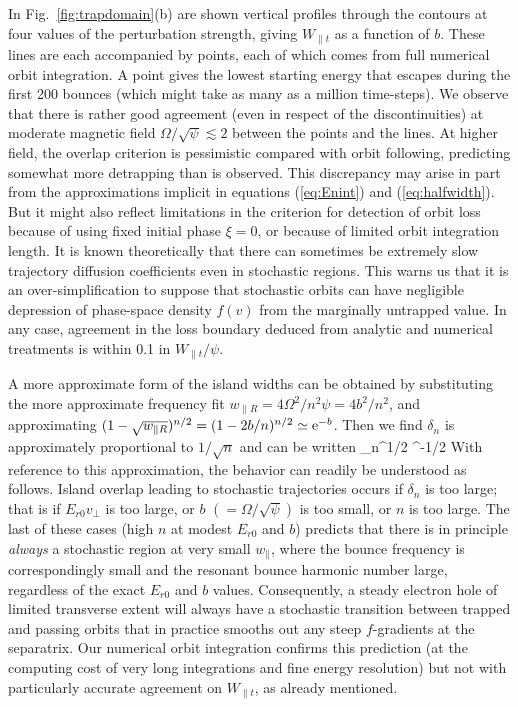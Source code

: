 \documentclass{agujournal2019}
\let\oldequation\equation
\let\oldendequation\endequation
\renewenvironment{equation}
  {\linenomathNonumbers\oldequation}
  {\oldendequation\endlinenomath}
\def\citep{\cite}
\def\wp{w_\parallel}
\def\wr{w_{\parallel R}}
\begin{document}
In Fig.\ \ref{fig:trapdomain}(b) are shown vertical profiles through
the contours at four values of the perturbation strength, giving
$W_{\parallel t}$ as a function of $b$. These lines are each
accompanied by points, each of which comes from full numerical orbit
integration. A point gives the lowest starting energy that escapes
during the first 200 bounces (which might take as many as a million
time-steps). We observe that there is rather good agreement (even in
respect of the discontinuities) at moderate magnetic field
$\Omega/\sqrt{\psi}\lesssim 2$ between the points and the lines. At
higher field, the overlap criterion is pessimistic compared with orbit
following, predicting somewhat more detrapping than is observed.  This
discrepancy may arise in part from the approximations implicit in
equations (\ref{eq:Enint}) and (\ref{eq:halfwidth}). But it might also
reflect limitations in the criterion for detection of orbit loss
because of using fixed initial phase $\xi=0$, or because of limited
orbit integration length.  It is known theoretically \citep{Meiss1992}
that there can sometimes be extremely slow trajectory diffusion
coefficients even in stochastic regions. This warns us that it is an
over-simplification to suppose that stochastic orbits can have
negligible depression of phase-space density $f(v)$ from the
marginally untrapped value. In any case, agreement in the loss
boundary deduced from analytic and numerical treatments is within 0.1
in $W_{\parallel t}/\psi$.

A more approximate form of the island widths can be obtained by 
substituting the more approximate frequency fit 
$\wr =4\Omega^2/n^2\psi=4b^2/n^2$, and
approximating $(1-\sqrt{\wr })^{n/2}
=(1-2b/n)^{n/2}\simeq
{\rm e}^{-b}$. Then we find $\delta_n$ is
approximately proportional to $1/\sqrt{n}$ and can be
written
\begin{equation}
  \label{eq:halfomega}
 \delta_n\simeq{}^{1/2}
 ^{-1/2}
\end{equation}
With reference to this approximation, the behavior can readily be
understood as follows. Island overlap leading to stochastic
trajectories occurs if $\delta_n$ is too large; that is if $E_{r0}v_\perp$ is too
large, or $b$ $(=\Omega/\sqrt\psi)$ is too small, or $n$ is too
large. The last of these cases (high $n$
at modest $E_{r0}$ and $b$) predicts that there is in principle
\emph{always} a stochastic region at very small $\wp$, where the
bounce frequency is correspondingly small and the resonant bounce
harmonic number large, regardless of the exact $E_{r0}$ and $b$
values. Consequently, a steady electron hole of limited transverse
extent will always have a stochastic transition between trapped and
passing orbits that in practice smooths out any steep $f$-gradients at
the separatrix. Our numerical orbit integration confirms this
prediction (at the computing cost of very long integrations and fine
energy resolution) but not with particularly accurate
agreement on $W_{\parallel t}$, as already mentioned.
\end{document}
